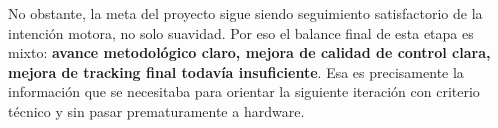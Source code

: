 \documentclass[11pt,a4paper]{article}
\begin{document}
No obstante, la meta del proyecto sigue siendo seguimiento satisfactorio de la intenci\'on motora, no solo suavidad. Por eso el balance final de esta etapa es mixto: \textbf{avance metodol\'ogico claro, mejora de calidad de control clara, mejora de tracking final todav\'ia insuficiente}. Esa es precisamente la informaci\'on que se necesitaba para orientar la siguiente iteraci\'on con criterio t\'ecnico y sin pasar prematuramente a hardware.



\end{document}
